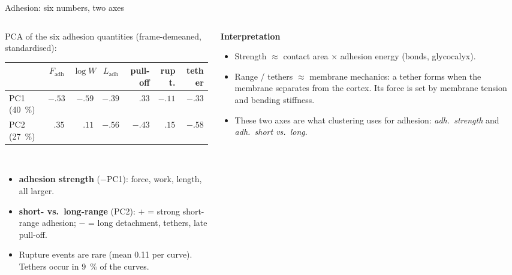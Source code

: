 \documentclass[aspectratio=169,9pt]{beamer}
\begin{document}
\begin{frame}{Adhesion: six numbers, two axes}
\footnotesize
\begin{columns}[T]
\begin{column}{0.52\textwidth}
PCA of the six adhesion quantities (frame-demeaned, standardised):\\[3pt]
\begin{tabular}{@{}lrrrrrr@{}}\toprule
& $F_\mathrm{adh}$ & $\log W$ & $L_\mathrm{adh}$ & pull-off & rupt. & tether \\\midrule
PC1 (\SI{40}{\percent}) & $-.53$ & $-.59$ & $-.39$ & $.33$ & $-.11$ & $-.33$\\
PC2 (\SI{27}{\percent}) & $.35$ & $.11$ & $-.56$ & $-.43$ & $.15$ & $-.58$\\
\bottomrule\end{tabular}\\[6pt]
\begin{itemize}
\item \textbf{adhesion strength} ($-$PC1): force, work, length, all larger.
\item \textbf{short- vs.\ long-range} (PC2): $+$ = strong short-range adhesion; $-$ = long detachment, tethers, late pull-off.
\item Rupture events are rare (mean 0.11 per curve). Tethers occur in \SI{9}{\percent} of the curves.
\end{itemize}
\end{column}
\begin{column}{0.45\textwidth}
\textbf{Interpretation}
\begin{itemize}
\item Strength $\approx$ contact area $\times$ adhesion energy (bonds, glycocalyx).
\item Range / tethers $\approx$ membrane mechanics: a tether forms when the membrane separates from the cortex. Its force is set by membrane tension and bending stiffness.
\item These two axes are what clustering uses for adhesion: \emph{adh.\ strength} and \emph{adh.\ short vs.\ long}.
\end{itemize}
\end{column}
\end{columns}
\end{frame}
\end{document}
